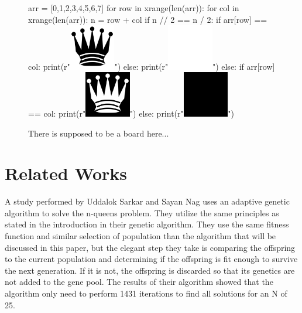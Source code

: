 \documentclass{vgtc}                          %
\begin{document}
\begin{figure}
\begin{pycode}
arr = [0,1,2,3,4,5,6,7]
for row in xrange(len(arr)):
  for col in xrange(len(arr)):
    n = row + col
    if n // 2 == n / 2:
    if arr[row] == col:
      print(r"\includegraphics[width=2cm]{Pictures/BQWT.jpg}")
    else:
      print(r"\includegraphics[width=2cm]{Pictures/WT.jpg}")
    else:
    if arr[row] == col:
      print(r"\includegraphics[width=2cm]{Pictures/WQBT.jpg}")
    else:
      print(r"\includegraphics[width=2cm]{Pictures/BT.jpg}")
\end{pycode}
\label{fig:board1}
\caption{There is supposed to be a board here...}
\end{figure}

\section{Related Works}
A study performed by Uddalok Sarkar and Sayan Nag uses an adaptive genetic algorithm to solve the n-queens problem. They utilize the same principles as stated in the introduction in their genetic algorithm. They use the same fitness function and similar selection of population than the algorithm that will be discussed in this paper, but the elegant step they take is comparing the offspring to the current population and determining if the offspring is fit enough to survive the next generation. If it is not, the offspring is discarded so that its genetics are not added to the gene pool. The results of their algorithm showed that the algorithm only need to perform 1431 iterations to find all solutions for an N of 25. 
\end{document}

